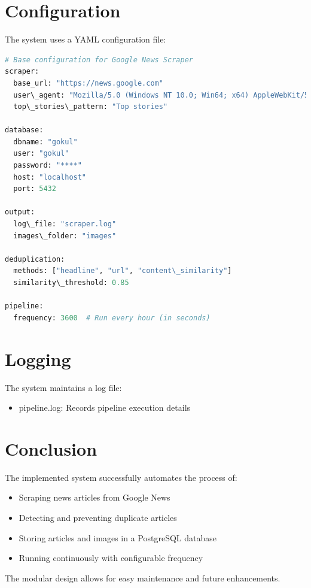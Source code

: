\documentclass{article}
\begin{document}
\section{Configuration}
The system uses a YAML configuration file:

\begin{lstlisting}[language=PYTHON]
# Base configuration for Google News Scraper
scraper:
  base_url: "https://news.google.com"
  user\_agent: "Mozilla/5.0 (Windows NT 10.0; Win64; x64) AppleWebKit/537.36"
  top\_stories\_pattern: "Top stories"

database:
  dbname: "gokul"
  user: "gokul"
  password: "****"
  host: "localhost"
  port: 5432

output:
  log\_file: "scraper.log"
  images\_folder: "images"

deduplication:
  methods: ["headline", "url", "content\_similarity"]
  similarity\_threshold: 0.85

pipeline:
  frequency: 3600  # Run every hour (in seconds)
\end{lstlisting}

\section{Logging}
The system maintains a log file:
\begin{itemize}
    \item pipeline.log: Records pipeline execution details
\end{itemize}

\section{Conclusion}
The implemented system successfully automates the process of:
\begin{itemize}
    \item Scraping news articles from Google News
    \item Detecting and preventing duplicate articles
    \item Storing articles and images in a PostgreSQL database
    \item Running continuously with configurable frequency
\end{itemize}

The modular design allows for easy maintenance and future enhancements.
\end{document}
